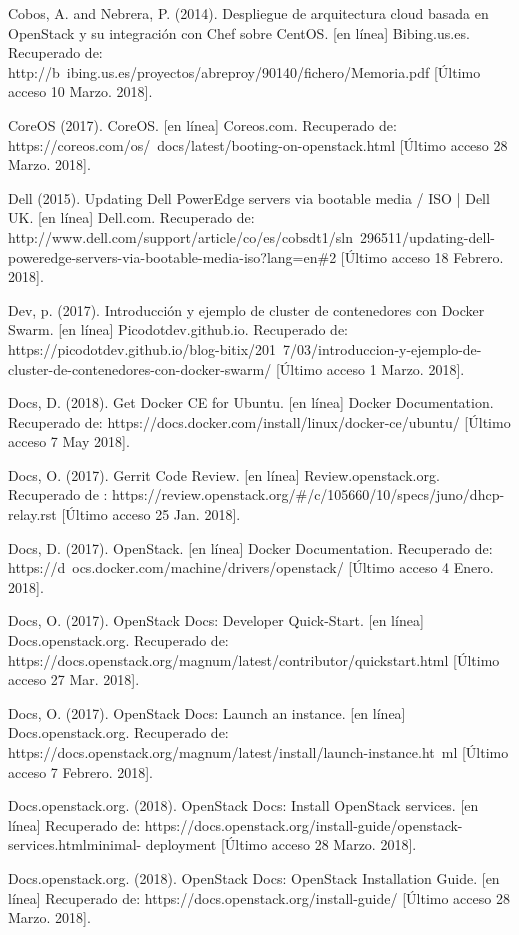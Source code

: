 Cobos, A. and Nebrera, P. (2014). Despliegue de arquitectura cloud basada en OpenStack y su integración con Chef sobre CentOS. [en línea] Bibing.us.es. Recuperado de: http://b\ ibing.us.es/proyectos/abreproy/90140/fichero/Memoria.pdf [Último acceso 10 Marzo. 2018].

CoreOS (2017). CoreOS. [en línea] Coreos.com. Recuperado de: https://coreos.com/os/\ docs/latest/booting-on-openstack.html [Último acceso 28 Marzo. 2018].


Dell (2015). Updating Dell PowerEdge servers via bootable media / ISO | Dell UK. [en línea] Dell.com. Recuperado de: http://www.dell.com/support/article/co/es/cobsdt1/sln\ 296511/updating-dell-poweredge-servers-via-bootable-media-iso?lang=en\#2 [Último acceso 18 Febrero. 2018].

Dev, p. (2017). Introducción y ejemplo de cluster de contenedores con Docker Swarm. [en línea] Picodotdev.github.io. Recuperado de: https://picodotdev.github.io/blog-bitix/201\ 7/03/introduccion-y-ejemplo-de-cluster-de-contenedores-con-docker-swarm/ [Último acceso 1 Marzo. 2018].


Docs, D. (2018). Get Docker CE for Ubuntu. [en línea] Docker Documentation. Recuperado de: https://docs.docker.com/install/linux/docker-ce/ubuntu/ [Último acceso 7 May 2018].

Docs, O. (2017). Gerrit Code Review. [en línea] Review.openstack.org. Recuperado de : https://review.openstack.org/\#/c/105660/10/specs/juno/dhcp-relay.rst [Último acceso 25 Jan. 2018].

Docs, D. (2017). OpenStack. [en línea] Docker Documentation. Recuperado de: https://d\ ocs.docker.com/machine/drivers/openstack/ [Último acceso 4 Enero. 2018].

Docs, O. (2017). OpenStack Docs: Developer Quick-Start. [en línea] Docs.openstack.org. Recuperado de: https://docs.openstack.org/magnum/latest/contributor/quickstart.html [Último acceso 27 Mar. 2018].

Docs, O. (2017). OpenStack Docs: Launch an instance. [en línea] Docs.openstack.org. Recuperado de: https://docs.openstack.org/magnum/latest/install/launch-instance.ht\ ml [Último acceso 7 Febrero. 2018].

Docs.openstack.org. (2018). OpenStack Docs: Install OpenStack services. [en línea] Recuperado de: https://docs.openstack.org/install-guide/openstack-services.htmlminimal-
deployment [Último acceso 28 Marzo. 2018].

Docs.openstack.org. (2018). OpenStack Docs: OpenStack Installation Guide. [en línea] Recuperado de: https://docs.openstack.org/install-guide/ [Último acceso 28 Marzo. 2018].

